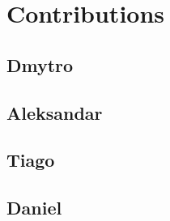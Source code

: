 \section{Contributions}
\label{app:contributions}

\subsection*{Dmytro}



\subsection*{Aleksandar}



\subsection*{Tiago}



\subsection*{Daniel}


